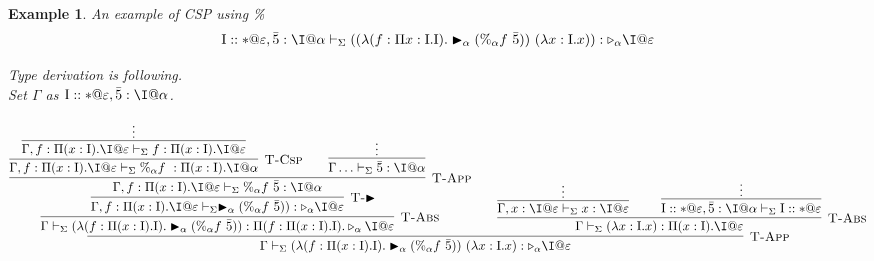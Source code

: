 \documentclass[9pt, a4paper]{extarticle}
\theoremstyle{break}
\newtheorem{ex}{Example}
\newif\iffullversion
\newcommand{\G}{\Gamma}
\newcommand{\V}{\vdash_\Sigma}
\newcommand{\TW}{\triangleright}
\newcommand{\TB}{\blacktriangleright}
\begin{document}
\iffullversion
	\begin{ex}
		\newcommand{\M}{\textrm{M}}
		\newcommand{\I}{\textrm{I}}
		An example of CSP using \%
		\begin{align*}
			\I::*@\varepsilon,\bar{5}:\I@\alpha\V ((\lambda(f:\Pi x:\I.\I).\TB_\alpha (\%_\alpha f\ \bar{5}))\ (\lambda x:\I.x)) : \TW_\alpha \I@\varepsilon
		\end{align*}

		Type derivation is following.\\
		Set $\G$ as $\I::*@\varepsilon,\bar{5}:\I@\alpha$.
		\begin{center}
			$$
				\infer[\textsc{T-App}]
				{\G\V (\lambda(f:\Pi (x:\I).\I).\TB_\alpha (\%_\alpha f\ \bar{5}))\ (\lambda x:\I.x) : \TW_\alpha\I@\varepsilon}
				{\infer[\textsc{T-Abs}]
					{\G\V (\lambda(f:\Pi (x:\I).\I).\TB_\alpha (\%_\alpha f\ \bar{5})):\Pi (f:\Pi (x:\I).\I).\TW_\alpha \I@\varepsilon}
					{\infer[\textsc{T-$\TB$}]
						{\G ,f:\Pi (x:\I).\I@\varepsilon \V \TB_\alpha (\%_\alpha f\ \bar{5})):\TW_\alpha \I@\varepsilon}
						{\infer[\textsc{T-App}]
							{\G ,f:\Pi (x:\I).\I@\varepsilon \V\%_\alpha f\ \bar{5}: \I@\alpha}
							{\infer[\textsc{T-Csp}]
								{\G ,f:\Pi (x:\I).\I@\varepsilon \V \%_\alpha f\ : \Pi (x:\I).\I@\alpha}
								{\infer[]{\G ,f:\Pi (x:\I).\I@\varepsilon \V f: \Pi (x:\I).\I@\varepsilon}{\vdots}}
								\andalso
								\infer[]
								{\G\ldots \V \bar{5}: \I@\alpha}
								{\vdots}
							}
						}
					}\andalso
					\infer[\textsc{T-Abs}]
					{\G\V(\lambda x:\I.x):\Pi (x:\I).\I@\varepsilon}
					{
						\infer[]{\G,x:\I@\varepsilon\V x:\I@\varepsilon}{\vdots} \andalso \infer[]{\I::*@\varepsilon,\bar{5}:\I@\alpha\V\I::*@\varepsilon}{\vdots}}}
			$$
		\end{center}
	\end{ex}
\end{document}
